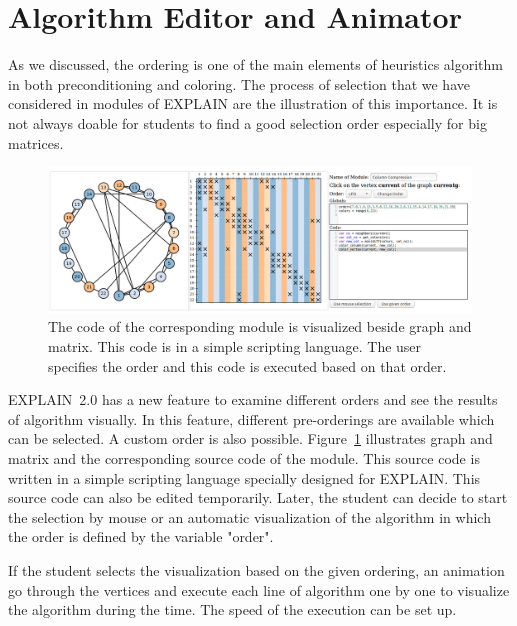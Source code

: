 \documentclass[11pt, twoside,a4paper]{book}
\begin{document}
\section{Algorithm Editor and Animator}
\label{s.alg.edit}
As we discussed, the ordering is one of the main elements of heuristics algorithm
in both preconditioning and coloring. The process of selection that we have
considered in modules of \mbox{EXPLAIN} are the illustration of this importance.
It is not always doable for students to find a good selection order especially for
big matrices.
\begin{figure}
\centering
\includegraphics[width=\textwidth]{custom_module}
\caption{The code of the corresponding module is visualized beside
graph and matrix. This code is in a simple scripting language.
The user specifies the order and this code is executed based on that order.}
\label{f.custom_module}
\end{figure}

\mbox{EXPLAIN 2.0} has a new feature to examine different orders
and see the results of algorithm visually. In this feature, different
pre-orderings are available which can be selected. A custom order is
also possible. Figure~\ref{f.custom_module} illustrates graph and matrix
and the corresponding source code of the module. This source code
is written in a simple scripting language specially designed for \mbox{EXPLAIN}.
This source code can also be edited temporarily. Later, the student can
decide to start the selection by mouse or an automatic visualization
of the algorithm in which the order is defined by the variable "order".

If the student selects the visualization based on the given ordering,
an animation go through the vertices and execute each line of algorithm
one by one to visualize the algorithm during the time.
The speed of the execution can be set up.
\end{document}
